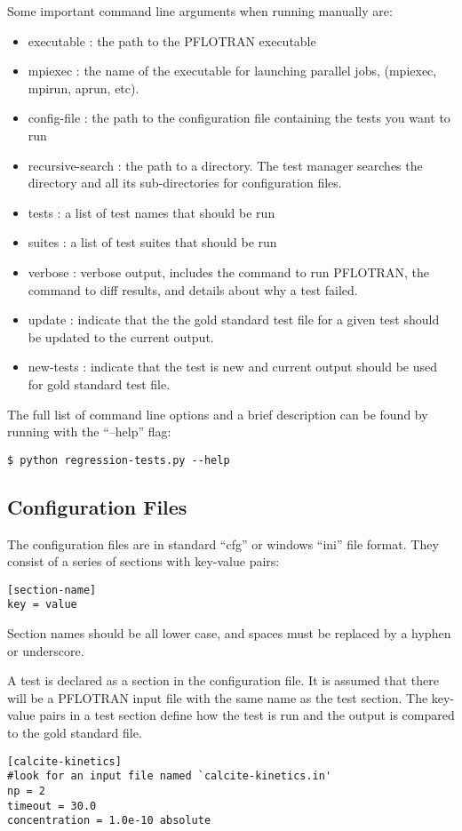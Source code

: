 Some important command line arguments when running manually are:
\begin{itemize}
\item executable : the path to the PFLOTRAN executable
\item mpiexec : the name of the executable for launching parallel
  jobs, (mpiexec, mpirun, aprun, etc).
\item config-file : the path to the configuration file containing the
  tests you want to run
\item recursive-search : the path to a directory. The test manager
  searches the directory and all its sub-directories for configuration
  files.
\item tests : a list of test names that should be run
\item suites : a list of test suites that should be run
\item verbose : verbose output, includes the command to run PFLOTRAN,
  the command to diff results, and details about why a test failed.
\item update : indicate that the the gold standard test file for a
  given test should be updated to the current output.
\item new-tests : indicate that the test is new and current output
  should be used for gold standard test file.
\end{itemize}

The full list of command line options and a brief description can be
found by running with the ``--help'' flag:
\begin{verbatim}
$ python regression-tests.py --help
\end{verbatim}

\subsection{Configuration Files}
The configuration files are in standard ``cfg'' or windows ``ini''
file format. They consist of a series of sections with key-value pairs:
\begin{verbatim}
[section-name]
key = value
\end{verbatim}
Section names should be all lower case, and spaces must be replaced by
a hyphen or underscore.

A test is declared as a section in the configuration file. It is assumed that
there will be a PFLOTRAN input file with the same name as the test
section. The key-value pairs in a test section define how the test is
run and the output is compared to the gold standard file. 
\begin{verbatim}
[calcite-kinetics]
#look for an input file named `calcite-kinetics.in'
np = 2
timeout = 30.0
concentration = 1.0e-10 absolute
\end{verbatim}

